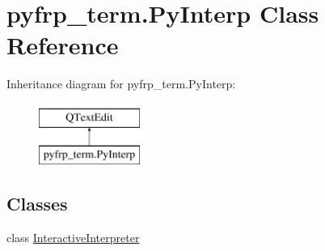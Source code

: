\hypertarget{classpyfrp__term_1_1PyInterp}{\section{pyfrp\+\_\+term.\+Py\+Interp Class Reference}
\label{classpyfrp__term_1_1PyInterp}
}
Inheritance diagram for pyfrp\+\_\+term.\+Py\+Interp\+:\begin{figure}[H]
\begin{center}
\leavevmode
\includegraphics[height=2.000000cm]{classpyfrp__term_1_1PyInterp}
\end{center}
\end{figure}
\subsection*{Classes}
\begin{DoxyCompactItemize}
\item 
class \hyperlink{classpyfrp__term_1_1PyInterp_1_1InteractiveInterpreter}{Interactive\+Interpreter}
\end{DoxyCompactItemize}
